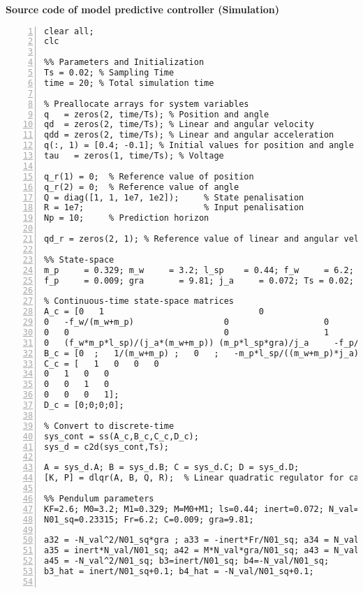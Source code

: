 \normalsize\bf{Source code of model predictive controller (Simulation)}
\label{mpcSim.m}
\vspace{1cm}
\begin{lstlisting}[numbers=left,basicstyle=\scriptsize,caption={Source code of model predictive controller (Simulation).},captionpos=b]	
% Clear workspace, command window, and import CasADi library
clear all;
clc

%% Parameters and Initialization
Ts = 0.02; % Sampling Time
time = 20; % Total simulation time

% Preallocate arrays for system variables
q   = zeros(2, time/Ts); % Position and angle
qd  = zeros(2, time/Ts); % Linear and angular velocity
qdd = zeros(2, time/Ts); % Linear and angular acceleration
q(:, 1) = [0.4; -0.1]; % Initial values for position and angle
tau   = zeros(1, time/Ts); % Voltage

q_r(1) = 0;  % Reference value of position
q_r(2) = 0;  % Reference value of angle
Q = diag([1, 1, 1e7, 1e2]);     % State penalisation 
R = 1e7;                        % Input penalisation
Np = 10;     % Prediction horizon 

qd_r = zeros(2, 1); % Reference value of linear and angular velocity

%% State-space
m_p     = 0.329; m_w     = 3.2; l_sp    = 0.44; f_w     = 6.2; 
f_p     = 0.009; gra       = 9.81; j_a     = 0.072; Ts = 0.02; 

% Continuous-time state-space matrices
A_c = [0   1                               0                   0
0   -f_w/(m_w+m_p)                  0                   0
0   0                               0                   1
0   (f_w*m_p*l_sp)/(j_a*(m_w+m_p)) (m_p*l_sp*gra)/j_a     -f_p/j_a];   
B_c = [0  ;   1/(m_w+m_p) ;   0   ;   -m_p*l_sp/((m_w+m_p)*j_a)];
C_c = [   1   0   0   0
0   1   0   0
0   0   1   0
0   0   0   1];
D_c = [0;0;0;0];

% Convert to discrete-time
sys_cont = ss(A_c,B_c,C_c,D_c);
sys_d = c2d(sys_cont,Ts);

A = sys_d.A; B = sys_d.B; C = sys_d.C; D = sys_d.D;
[K, P] = dlqr(A, B, Q, R);	% Linear quadratic regulator for callculating the P matrix

%% Pendulum parameters
KF=2.6; M0=3.2; M1=0.329; M=M0+M1; ls=0.44; inert=0.072; N_val=0.1446;
N01_sq=0.23315; Fr=6.2; C=0.009; gra=9.81;

a32 = -N_val^2/N01_sq*gra ; a33 = -inert*Fr/N01_sq; a34 = N_val*C/N01_sq; 
a35 = inert*N_val/N01_sq; a42 = M*N_val*gra/N01_sq; a43 = N_val*Fr/N01_sq; a44 = -M*C/N01_sq;
a45 = -N_val^2/N01_sq; b3=inert/N01_sq; b4=-N_val/N01_sq;
b3_hat = inert/N01_sq+0.1; b4_hat = -N_val/N01_sq+0.1;


\end{lstlisting}
